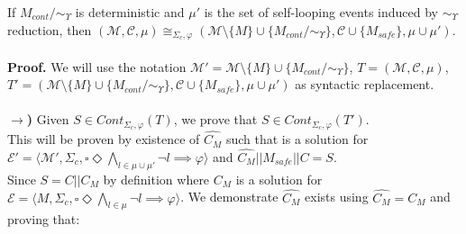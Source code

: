     If $M_{cont} \slash \! \sim_\Upsilon$ is deterministic and $\mu'$ is the set of self-looping events induced by $\sim_\Upsilon$ reduction, then  $(\mathcal{M}, \mathcal{C}, \mu) \cong_{\Sigma_c, \varphi} (\mathcal{M} \setminus \{M\} \cup \{M_{cont} \slash \! \sim_\Upsilon\}, \mathcal{C} \cup \{ M_{safe} \}, \mu \cup \mu')$.  \\ \\ 
\textbf{Proof.} 
We will use the notation $\mathcal{M'} = \mathcal{M} \setminus \{M\} \cup \{M_{cont} \slash \! \sim_\Upsilon\}$, $T = (\mathcal{M}, \mathcal{C}, \mu)$, $T' = (\mathcal{M} \setminus \{M\} \cup \{M_{cont} \slash \! \sim_\Upsilon\}, \mathcal{C} \cup \{ M_{safe} \}, \mu \cup \mu')$ as syntactic replacement. \\ \\
\textbf{$\xrightarrow{}$)} Given $S \in Cont_{\Sigma_c, \varphi}(T)$, we prove that $S \in Cont_{\Sigma_c, \varphi}(T')$. \\
This will be proven by existence of $\hat{C_{M}}$ such that is a solution for $\mathcal{E'} = \langle \mathcal{M'}, \Sigma_c, \square \Diamond \bigwedge_{l \in \mu \cup \mu'} \neg l \implies \varphi \rangle$ and $\hat{C_{M}} || M_{safe} || C = S$. \\
Since $S = C || C_M$ by definition where $C_M$ is a solution for $\mathcal{E} = \langle M, \Sigma_c, \square \Diamond \bigwedge_{l \in \mu} \neg l \implies \varphi \rangle$. We  demonstrate $\hat{C_M}$ exists using $\hat{C_M} = C_M$ and proving that:

